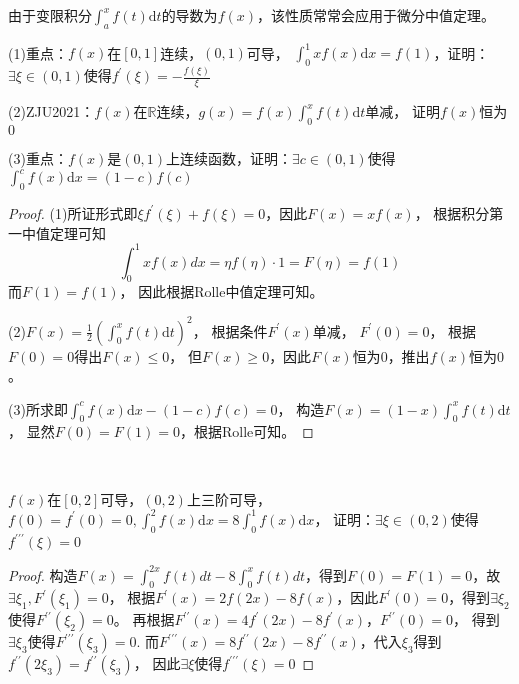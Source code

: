 由于变限积分$\int_a^xf(t)\mathrm{d}t$的导数为$f(x)$，该性质常常会应用于微分中值定理。

\begin{exercise}[基础问题]
  (1)重点：$f(x)$在$[0,1]$连续，$(0,1)$可导，
  $\int_0^1 xf(x) \mathrm{d}x = f(1)$，证明：$\exists \xi \in (0,1)$使得$f^{\prime}(\xi) = - \frac{f(\xi)}{\xi}$

  (2)ZJU2021：$f(x)$在$\mathbb{R}$连续，$g(x) = f(x) \int_0^x f(t)\mathrm{d}t$单减，
  证明$f(x)$恒为$0$

  (3)重点：$f(x)$是$(0,1)$上连续函数，证明：$\exists c \in (0,1)$使得$\int_0^c f(x)\mathrm{d}x = (1 - c)f(c)$
\end{exercise}

\begin{proof}
  (1)所证形式即$\xi f^{\prime}(\xi) +  f(\xi) = 0$，因此$F(x) = xf(x)$，
  根据积分第一中值定理可知
  \begin{equation*}
    \int_0^1 xf(x)dx = \eta f(\eta) \cdot 1 = F(\eta) = f(1)
  \end{equation*}
  而$F(1) = f(1)$，
  因此根据Rolle中值定理可知。

  (2)$F(x) = \frac{1}{2}(\int_0^x f(t)\mathrm{d}t)^2$，
  根据条件$F^{\prime}(x)$单减，
  $F^{\prime}(0) = 0$，
  根据$F(0) = 0$得出$F(x) \leq 0$，
  但$F(x) \geq 0$，因此$F(x)$恒为$0$，推出$f(x)$恒为$0$。

  (3)所求即$\int _0^c f(x)\mathrm{d}x - (1 - c)f(c) = 0$，
  构造$F(x) = (1 - x)\int_0^x f(t)\mathrm{d}t$，
  显然$F(0) = F(1) = 0$，根据Rolle可知。
\end{proof}

~

\begin{exercise}[进阶问题]
  $f(x)$在$[0,2]$可导，$(0,2)$上三阶可导，
  $f(0) = f^{\prime}(0) = 0, \int_0^2f(x)\mathrm{d}x = 8 \int_0^1f(x)\mathrm{d}x$，
  证明：$\exists \xi \in (0,2)$使得$f^{\prime\prime\prime}(\xi) = 0$
\end{exercise}

\begin{proof}
  构造$F(x) = \int_0^{2x}f(t)dt - 8\int_0^x f(t)dt$，得到$F(0) = F(1) = 0$，故$\exists \xi_1, F^{\prime}(\xi_1) = 0$，
  根据$F^{\prime}(x) = 2f(2x) - 8f(x)$，因此$F^{\prime}(0) = 0$，得到$\exists \xi_2$使得$F^{\prime\prime}(\xi_2) = 0$。
  再根据$F^{\prime\prime}(x) = 4f^{\prime}(2x) - 8f^{\prime}(x)$，$F^{\prime\prime}(0) = 0$，
  得到$\exists \xi_3$使得$F^{\prime\prime\prime}(\xi_3) = 0$.
  而$F^{\prime\prime\prime}(x) = 8f^{\prime\prime}(2x) - 8f^{\prime\prime}(x)$，代入$\xi_3$得到$f^{\prime\prime}(2 \xi_3) = f^{\prime\prime}(\xi_3)$，
  因此$\exists \xi$使得$f^{\prime\prime\prime}(\xi) = 0$
\end{proof}

